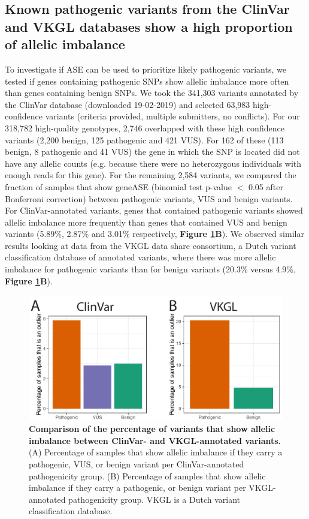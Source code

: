 \subsection{Known pathogenic variants from the ClinVar and VKGL databases show a high proportion of allelic imbalance}
To investigate if ASE can be used to prioritize likely pathogenic variants, we tested if genes containing pathogenic SNPs show allelic imbalance more often than genes containing benign SNPs. We took the 341,303 variants annotated by the ClinVar database (downloaded 19-02-2019) and selected 63,983 high-confidence variants (criteria provided, multiple submitters, no conflicts). For our 318,782 high-quality genotypes, 2,746 overlapped with these high confidence variants (2,200 benign, 125 pathogenic and 421 VUS). For 162 of these (113 benign, 8 pathogenic and 41 VUS) the gene in which the SNP is located did not have any allelic counts (e.g. because there were no heterozygous individuals with enough reads for this gene). For the remaining 2,584 variants, we compared the fraction of samples that show geneASE (binomial test p-value $<$ 0.05 after Bonferroni correction) between pathogenic variants, VUS and benign variants. For ClinVar-annotated variants, genes that contained pathogenic variants showed allelic imbalance more frequently than genes that contained VUS and benign variants (5.89\%, 2.87\% and 3.01\% respectively, \textbf{Figure \ref{ase_fig2}B})\cite{landrumClinVarImprovingAccess2018}. We observed similar results looking at data from the VKGL data share consortium\cite{fokkemaDutchGenomeDiagnostic2019}, a Dutch variant classification database of annotated variants, where there was more allelic imbalance for pathogenic variants than for benign variants (20.3\% versus 4.9\%, \textbf{Figure \ref{ase_fig2}B}). 

\begin{figure}[h!]
	\includegraphics[width=\textwidth]{chapters/chapter3-allele-specific-expression/img/fig2.pdf}
	\caption{\textbf{Comparison of the percentage of variants that show allelic imbalance between ClinVar- and VKGL-annotated variants.} (A) Percentage of samples that show allelic imbalance if they carry a pathogenic, VUS, or benign variant per ClinVar-annotated pathogenicity group. (B) Percentage of samples that show allelic imbalance if they carry a pathogenic, or benign variant per VKGL-annotated pathogenicity group. VKGL is a Dutch variant classification database. }
	\label{ase_fig2}
\end{figure}


